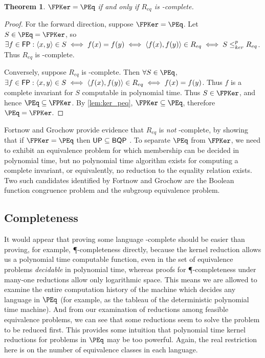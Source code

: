 \documentclass{article}
\newtheorem{theorem}{Theorem}[section]
\theoremstyle{definition} \newtheorem{definition}[definition]{Definition}
\newcommand{\kr}{\leq^{p}_{ker}} %
\newcommand{\pair}[2]{\langle#1,#2\rangle} %
\begin{document}
\begin{theorem}
  $\FPKer=\PEq$ if and only if $R_{eq}$ is \PEq-complete.
\end{theorem}
\begin{proof}
  For the forward direction, suppose $\FPKer=\PEq$. Let $S\in\PEq=\FPKer$, so
  $\exists f\in\FP: \pair{x}{y}\in S\iff f(x)=f(y)\iff \pair{f(x)}{f(y)}\in
  R_{eq}\iff S\kr R_{eq}$. Thus $R_{eq}$ is \PEq-complete.

  Conversely, suppose $R_{eq}$ is \PEq-complete. Then $\forall S\in\PEq$,
  $\exists f\in\FP:\pair{x}{y}\in S\iff\pair{f(x)}{f(y)}\in R_{eq}\iff
  f(x)=f(y)$. Thus $f$ is a complete invariant for $S$ computable in polynomial
  time. Thus $S\in\FPKer$, and hence $\PEq\subseteq\FPKer$. By
  \autoref{lem:ker_peq}, $\FPKer\subseteq\PEq$, therefore $\PEq=\FPKer$.
\end{proof}

Fortnow and Grochow provide evidence that $R_{eq}$ is \emph{not} \PEq-complete,
by showing that if $\FPKer=\PEq$ then ${\mathsf{UP}}\subseteq{\ensuremath{\mathsf{BQP}}}$ \cite{fg09}. To
separate $\PEq$ from $\FPKer$, we need to exhibit an equivalence problem for
which membership can be decided in polynomial time, but no polynomial time
algorithm exists for computing a complete invariant, or equivalently, no
reduction to the equality relation exists. Two such candidates identified by
Fortnow and Grochow are the Boolean function congruence problem and the
subgroup equivalence problem.


\subsection{Completeness}

It would appear that proving some language \PEq-complete should be easier than
proving, for example, \P-completeness directly, because the kernel reduction
allows us a polynomial time computable function, even in the set of equivalence
problems \emph{decidable} in polynomial time, whereas proofs for
\P-completeness under many-one reductions allow only logarithmic space. This
means we are allowed to examine the entire computation history of the machine
which decides any language in $\PEq$ (for example, as the tableau of the
deterministic polynomial time machine). And from our examination of reductions
among feasible equivalence problems, we can see that some reductions seem to
solve the problem to be reduced first. This provides some intuition that
polynomial time kernel reductions for problems in $\PEq$ may be too
powerful. Again, the real restriction here is on the number of equivalence
classes in each language.
\end{document}
